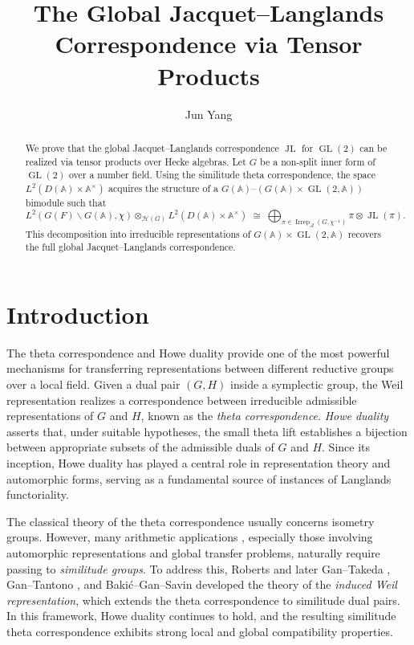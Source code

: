 \documentclass[11pt]{article}
\title{The Global Jacquet--Langlands Correspondence via Tensor Products}
\author{Jun Yang}
\date{}
\theoremstyle{plain}
\theoremstyle{remark}
\theoremstyle{definition}
\DeclareMathOperator{\GL}{GL}
\DeclareMathOperator{\JL}{JL}
\DeclareMathOperator{\irr}{Irrep}
\begin{document}
\maketitle

\begin{abstract}
We prove that the global Jacquet--Langlands correspondence $\JL$ for $\GL(2)$ can be realized via tensor products over Hecke algebras.
Let $G$ be a non-split inner form of $\GL(2)$ over a number field.
Using the similitude theta correspondence, the space $L^2(D(\mathbb{A})\times \mathbb{A}^{\times})$ acquires the structure of a $G(\mathbb{A})$--$(G(\mathbb{A})\times \GL(2,\mathbb{A}))$ bimodule such that
\begin{equation*}
L^2(G(F)\backslash G(\mathbb{A}),\chi) \otimes_{\mathcal{H}(G)} L^2(D(\mathbb{A})\times \mathbb{A}^{\times})
\;\cong\;
\bigoplus_{\pi \in \irr_{\mathcal{A}}(G,\chi^{-1})} \pi \otimes \JL(\pi). 
\end{equation*}
This decomposition into irreducible representations of $G(\mathbb{A})\times \GL(2,\mathbb{A})$ recovers the full global Jacquet--Langlands correspondence.
\end{abstract}


\tableofcontents

\section{Introduction}

The theta correspondence and Howe duality provide one of the most powerful mechanisms for transferring representations between different reductive groups over a local field.
Given a dual pair $(G,H)$ inside a symplectic group, the Weil representation realizes a correspondence between irreducible admissible representations of $G$ and $H$, known as the \emph{theta correspondence}.
\emph{Howe duality} asserts that, under suitable hypotheses, the small theta lift establishes a bijection between appropriate subsets of the admissible duals of $G$ and $H$.
Since its inception, Howe duality has played a central role in representation theory and automorphic forms, serving as a fundamental source of instances of Langlands functoriality.

The classical theory of the theta correspondence usually concerns isometry groups.
However, many arithmetic applications \cite{HarrisKudla1992}, especially those involving automorphic representations and global transfer problems, naturally require passing to \emph{similitude groups}.
To address this, Roberts \cite{RobertBrooks1996} and later Gan--Takeda \cite{GanTak2011}, Gan--Tantono \cite{GanTan2014}, and Baki\'{c}--Gan--Savin \cite{BGS2024} developed the theory of the \emph{induced Weil representation}, which extends the theta correspondence to similitude dual pairs.
In this framework, Howe duality continues to hold, and the resulting similitude theta correspondence exhibits strong local and global compatibility properties.
\end{document}
